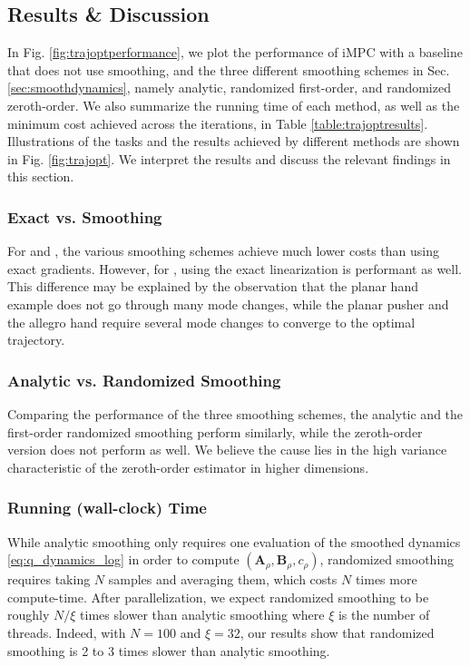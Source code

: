 
\subsection{Results \& Discussion}
In Fig. \ref{fig:trajoptperformance}, we plot the performance of iMPC with a baseline that does not use smoothing, and the three different smoothing schemes in Sec. \ref{sec:smoothdynamics}, namely analytic, randomized first-order, and randomized zeroth-order. We also summarize the running time of each method, as well as the minimum cost achieved across the iterations, in Table \ref{table:trajoptresults}. Illustrations of the tasks and the results achieved by different methods are shown in Fig. \ref{fig:trajopt}. We interpret the results and discuss the relevant findings in this section. 
\subsubsection{Exact vs. Smoothing} For  and , the various smoothing schemes achieve much lower costs than using exact gradients. However, for , using the exact linearization is performant as well. This difference may be explained by the observation that the planar hand example does not go through many mode changes, while the planar pusher and the allegro hand require several mode changes to converge to the optimal trajectory.

\subsubsection{Analytic vs. Randomized Smoothing} Comparing the performance of the three smoothing schemes, the analytic and the first-order randomized smoothing perform similarly, while the zeroth-order version does not perform as well. We believe the cause lies in the high variance characteristic of the zeroth-order estimator in higher dimensions.


\subsubsection{Running (wall-clock) Time} While analytic smoothing only requires one evaluation of the smoothed dynamics \eqref{eq:q_dynamics_log} in order to compute $(\mathbf{A}_\rho,\mathbf{B}_\rho,c_\rho)$, randomized smoothing requires taking $N$ samples and averaging them, which costs $N$ times more compute-time. After parallelization, we expect randomized smoothing to be roughly $N/\xi$ times slower than analytic smoothing where $\xi$ is the number of threads. Indeed, with $N=100$ and $\xi=32$, our results show that randomized smoothing is 2 to 3 times slower than analytic smoothing.



